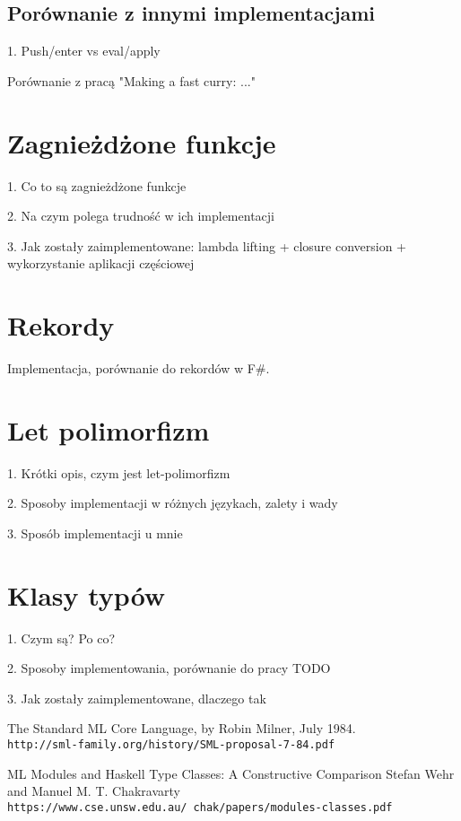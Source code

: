 \documentclass[declaration,shortabstract]{iithesis}
\begin{document}
\subsection{Porównanie z innymi implementacjami}

1. Push/enter vs eval/apply

Porównanie z pracą "Making a fast curry: ..."

\section{Zagnieżdżone funkcje}

1. Co to są zagnieżdżone funkcje 

2. Na czym polega trudność w ich implementacji 

3. Jak zostały zaimplementowane: lambda lifting + closure conversion + 
wykorzystanie aplikacji częściowej

\section{Rekordy}

Implementacja, porównanie do rekordów w F\#.

\section{Let polimorfizm}

1. Krótki opis, czym jest let-polimorfizm

2. Sposoby implementacji w różnych językach, zalety i wady 

3. Sposób implementacji u mnie

\section{Klasy typów}

1. Czym są? Po co? 

2. Sposoby implementowania, porównanie do pracy TODO

3. Jak zostały zaimplementowane, dlaczego tak


\begin{thebibliography}{1}

The Standard ML Core Language, by Robin Milner, July 1984.
\\\texttt{http://sml-family.org/history/SML-proposal-7-84.pdf}

ML Modules and Haskell Type Classes:
A Constructive Comparison
Stefan Wehr and Manuel M. T. Chakravarty
\\\texttt{https://www.cse.unsw.edu.au/~chak/papers/modules-classes.pdf}

\end{thebibliography}
\end{document}
